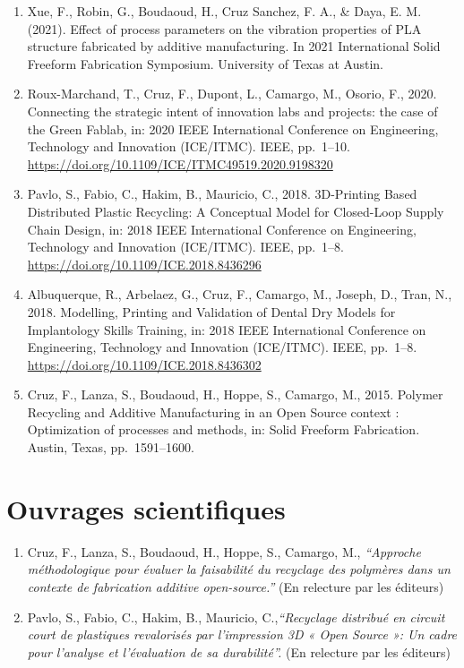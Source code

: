 \documentclass[
  12pt,
  oneside]{book}
\begin{document}
\begin{enumerate}
\def\labelenumi{\arabic{enumi}.}
\item
  Xue, F., Robin, G., Boudaoud, H., Cruz Sanchez, F. A., \& Daya, E. M. (2021). Effect of process parameters on the vibration properties of PLA structure fabricated by additive manufacturing. In 2021 International Solid Freeform Fabrication Symposium. University of Texas at Austin.
\item
  Roux-Marchand, T., Cruz, F., Dupont, L., Camargo, M., Osorio, F., 2020. Connecting the strategic intent of innovation labs and projects: the case of the Green Fablab, in: 2020 IEEE International Conference on Engineering, Technology and Innovation (ICE/ITMC). IEEE, pp.~1--10. \url{https://doi.org/10.1109/ICE/ITMC49519.2020.9198320}
\item
  Pavlo, S., Fabio, C., Hakim, B., Mauricio, C., 2018. 3D-Printing Based Distributed Plastic Recycling: A Conceptual Model for Closed-Loop Supply Chain Design, in: 2018 IEEE International Conference on Engineering, Technology and Innovation (ICE/ITMC). IEEE, pp.~1--8. \url{https://doi.org/10.1109/ICE.2018.8436296}
\item
  Albuquerque, R., Arbelaez, G., Cruz, F., Camargo, M., Joseph, D., Tran, N., 2018. Modelling, Printing and Validation of Dental Dry Models for Implantology Skills Training, in: 2018 IEEE International Conference on Engineering, Technology and Innovation (ICE/ITMC). IEEE, pp.~1--8. \url{https://doi.org/10.1109/ICE.2018.8436302}
\item
  Cruz, F., Lanza, S., Boudaoud, H., Hoppe, S., Camargo, M., 2015. Polymer Recycling and Additive Manufacturing in an Open Source context : Optimization of processes and methods, in: Solid Freeform Fabrication. Austin, Texas, pp.~1591--1600.
\end{enumerate}

\hypertarget{ouvrages-scientifiques}{%
\section{Ouvrages scientifiques}\label{ouvrages-scientifiques}}

\begin{enumerate}
\def\labelenumi{\arabic{enumi}.}
\item
  Cruz, F., Lanza, S., Boudaoud, H., Hoppe, S., Camargo, M., \emph{``Approche méthodologique pour évaluer la faisabilité du recyclage des polymères dans un contexte de fabrication additive open-source.''} (En relecture par les éditeurs)
\item
  Pavlo, S., Fabio, C., Hakim, B., Mauricio, C.,\emph{``Recyclage distribué en circuit court de plastiques revalorisés par l'impression 3D « Open Source »: Un cadre pour l'analyse et l'évaluation de sa durabilité''.} (En relecture par les éditeurs)
\end{enumerate}
\end{document}
